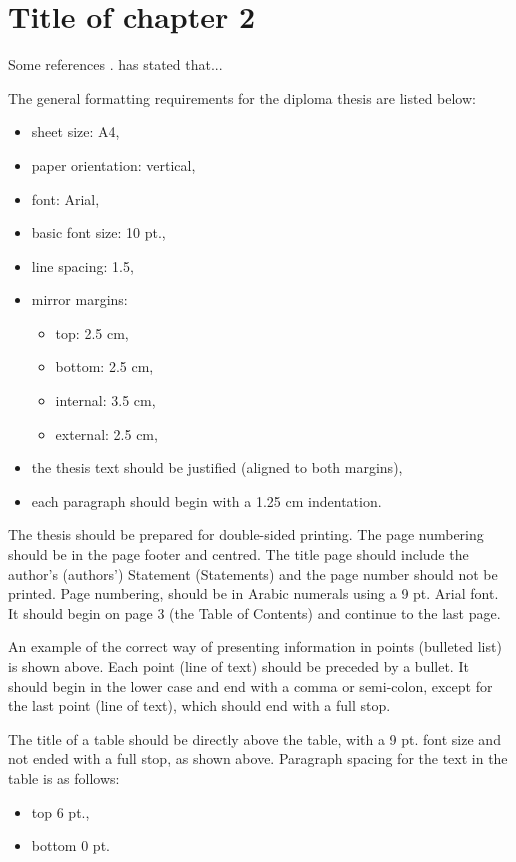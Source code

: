 \chapter{Title of chapter 2}

Some references \cite{AvrNiemeijer,OpticDiscHaar,HSIRGB,BiologiaVillee}.
\citet{DiabetesKlonoff} has stated that...

The general formatting requirements for the diploma thesis are listed below:
\begin{itemize}
	\item sheet size: A4,
	\item paper orientation: vertical,
	\item font: Arial,
	\item basic font size: 10 pt.,
	\item line spacing: 1.5,
	\item mirror margins:
	\begin{itemize}
		\item top: 2.5 cm,
		\item bottom: 2.5 cm,
		\item internal: 3.5 cm,
		\item external: 2.5 cm,
	\end{itemize}
	\item the thesis text should be justified (aligned to both margins),
	\item each paragraph should begin with a 1.25 cm indentation.
\end{itemize}

The thesis should be prepared for double-sided printing. The page numbering should be in the page footer and centred. The title page should include the author’s (authors’) Statement (Statements) and the page number should not be printed. Page numbering, should be in Arabic numerals using a 9 pt. Arial font. It should begin on page 3 (the Table of Contents) and continue to the last page.

An example of the correct way of presenting information in points (bulleted list) is shown above. Each point (line of text) should be preceded by a bullet. It should begin in the lower case and end with a comma or semi-colon, except for the last point (line of text), which should end with a full stop.

The title of a table should be directly above the table, with a 9 pt. font size and not ended with a full stop, as shown above. Paragraph spacing for the text in the table is as follows:
\begin{itemize}
	\item top 6 pt.,
	\item bottom 0 pt.
\end{itemize}

